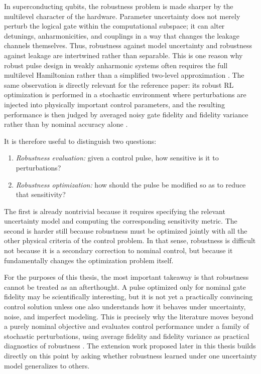 In superconducting qubits, the robustness problem is made sharper by the multilevel character of the hardware. Parameter uncertainty does not merely perturb the logical gate within the computational subspace; it can alter detunings, anharmonicities, and couplings in a way that changes the leakage channels themselves. Thus, robustness against model uncertainty and robustness against leakage are intertwined rather than separable. This is one reason why robust pulse design in weakly anharmonic systems often requires the full multilevel Hamiltonian rather than a simplified two-level approximation \cite{Krantz2019,Propson2022}. The same observation is directly relevant for the reference paper: its robust RL optimization is performed in a stochastic environment where perturbations are injected into physically important control parameters, and the resulting performance is then judged by averaged noisy gate fidelity and fidelity variance rather than by nominal accuracy alone \cite{Niu2019}.

It is therefore useful to distinguish two questions:
\begin{enumerate}
\item \emph{Robustness evaluation:} given a control pulse, how sensitive is it to perturbations?
\item \emph{Robustness optimization:} how should the pulse be modified so as to reduce that sensitivity?
\end{enumerate}
The first is already nontrivial because it requires specifying the relevant uncertainty model and computing the corresponding sensitivity metric. The second is harder still because robustness must be optimized jointly with all the other physical criteria of the control problem. In that sense, robustness is difficult not because it is a secondary correction to nominal control, but because it fundamentally changes the optimization problem itself.

For the purposes of this thesis, the most important takeaway is that robustness cannot be treated as an afterthought. A pulse optimized only for nominal gate fidelity may be scientifically interesting, but it is not yet a practically convincing control solution unless one also understands how it behaves under uncertainty, noise, and imperfect modeling. This is precisely why the literature moves beyond a purely nominal objective and evaluates control performance under a family of stochastic perturbations, using average fidelity and fidelity variance as practical diagnostics of robustness \cite{Niu2019}. The extension work proposed later in this thesis builds directly on this point by asking whether robustness learned under one uncertainty model generalizes to others.


